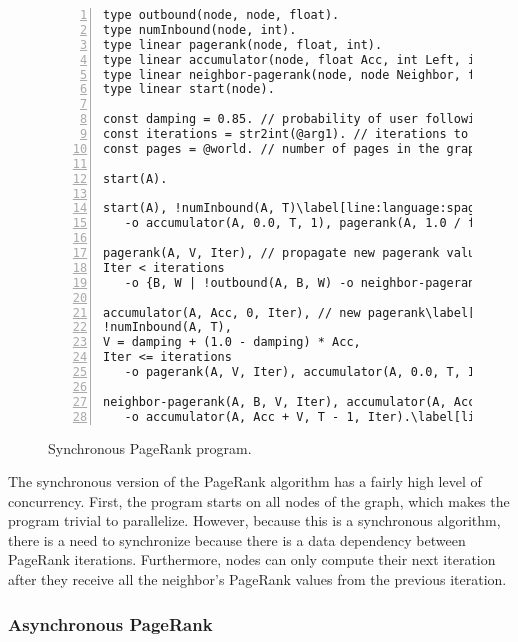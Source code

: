 \begin{figure}[h!]
\begin{Verbatim}[numbers=left,fontsize=\codesize,commandchars=\\\[\]]
type outbound(node, node, float).
type numInbound(node, int).
type linear pagerank(node, float, int).
type linear accumulator(node, float Acc, int Left, int Iteration).
type linear neighbor-pagerank(node, node Neighbor, float Rank, int Iteration).
type linear start(node).

const damping = 0.85. // probability of user following a link in the current page.
const iterations = str2int(@arg1). // iterations to compute.
const pages = @world. // number of pages in the graph.

start(A).

start(A), !numInbound(A, T)\label[line:language:spagerank_first1]
   -o accumulator(A, 0.0, T, 1), pagerank(A, 1.0 / float(pages), 0).\label[line:language:spagerank_first2]

pagerank(A, V, Iter), // propagate new pagerank value\label[line:language:spagerank_second1]
Iter < iterations
   -o {B, W | !outbound(A, B, W) -o neighbor-pagerank(B, A, V * W, Iter + 1)}.\label[line:language:spagerank_second2]

accumulator(A, Acc, 0, Iter), // new pagerank\label[line:language:spagerank_third1]
!numInbound(A, T),
V = damping + (1.0 - damping) * Acc,
Iter <= iterations
   -o pagerank(A, V, Iter), accumulator(A, 0.0, T, Iter + 1).\label[line:language:spagerank_third2]
	
neighbor-pagerank(A, B, V, Iter), accumulator(A, Acc, T, Iter)\label[line:language:spagerank_fourth1]
   -o accumulator(A, Acc + V, T - 1, Iter).\label[line:language:spagerank_fourth2]
\end{Verbatim}
\caption{Synchronous PageRank program.}
\label{language:code:pagerank}
\end{figure}

The synchronous version of the PageRank algorithm has a fairly high level of
concurrency. First, the program starts on all nodes of the graph, which makes
the program trivial to parallelize. However, because this is a synchronous
algorithm, there is a need to synchronize because there is a data dependency
between PageRank iterations. Furthermore, nodes can only compute their next
iteration after they receive all the neighbor's PageRank values from the
previous iteration.

\subsubsection{Asynchronous PageRank}

